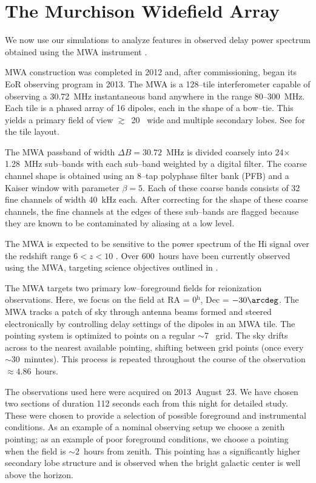 \documentclass[preprint2,iop,numberedappendix,twocolappendix,appendixfloats]{emulateapj}
\begin{document}
\section{The Murchison Widefield Array}\label{sec:MWA}

We now use our simulations to analyze features in observed delay power spectrum obtained using the MWA instrument \citep{lon09,tin13}.

MWA construction was completed in 2012 and, after commissioning, began its EoR observing program in 2013. The MWA is a 128--tile interferometer capable of observing a 30.72~MHz instantaneous band anywhere in the range 80--300~MHz. Each tile is a phased array of 16 dipoles, each in the shape of a bow--tie. This yields a primary field of view $\gtrsim$~20\arcdeg~ wide and multiple secondary lobes. See \citet{bea12} for the tile layout. 

The MWA passband of width $\Delta B=30.72$~MHz is divided coarsely into 24$\times$1.28~MHz sub--bands with each sub--band weighted by a digital filter. The coarse channel shape is obtained using an 8--tap polyphase filter bank (PFB) and a Kaiser window with parameter $\beta=5$. Each of these coarse bands consists of 32 fine channels of width 40~kHz each. After correcting for the shape of these coarse channels, the fine channels at the edges of these sub--bands are flagged because they are known to be contaminated by aliasing at a low level. 

The MWA is expected to be sensitive to the power spectrum of the H{\sc i} signal over the redshift range $6<z<10$ \citep{bow06,bea13,thy13}. Over 600~hours have been currently observed using the MWA, targeting science objectives outlined in \citet{bow13}.

The MWA targets two primary low--foreground fields for reionization observations. Here, we focus on the field at RA = 0$^\textrm{h}$, Dec = $-30\arcdeg$. The MWA tracks a patch of sky through antenna beams formed and steered electronically by controlling delay settings of the dipoles in an MWA tile. The pointing system is optimized to points on a regular $\sim$7\arcdeg~ grid. The sky drifts across to the nearest available pointing, shifting between grid points (once every $\sim 30$~minutes). This process is repeated throughout the course of the observation $\approx 4.86$~hours. 

The observations used here were acquired on 2013~August~23. We have chosen two sections of duration 112 seconds each from this night for detailed study. These were chosen to provide a selection of possible foreground and instrumental conditions. As an example of a nominal observing setup we choose a zenith pointing; as an example of poor foreground conditions, we choose a pointing when the field is $\sim 2$~hours from zenith. This pointing has a significantly higher secondary lobe structure and is observed when the bright galactic center is well above the horizon. 
\end{document}
